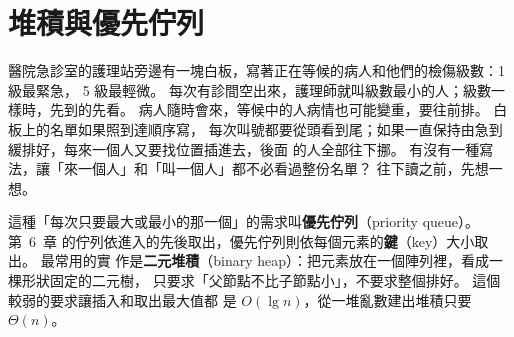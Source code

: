 \chapter{堆積與優先佇列}
\label{ch:heaps}

\newif\ifhpshowidx
\newcommand{\hpheap}[4]{%
    \foreach \hpv/\hps [count=\hpi] in {#3} {%
        \pgfmathtruncatemacro{\hplev}{floor(ln(\hpi)/ln(2) + 0.0001)}%
        \pgfmathsetmacro{\hpx}{(\hpi - 2^\hplev + 0.5) * #2 / 2^\hplev - #2 / 2}%
        \node[hp\hps] (#4\hpi) at ($(#1) + (\hpx, -0.95*\hplev)$) {\hpv};%
        \ifhpshowidx
            \node[hpidx, anchor=south west] at (#4\hpi.north east) {\hpi};%
        \fi
        \ifnum\hpi>1
            \pgfmathtruncatemacro{\hpp}{floor(\hpi/2)}%
            \draw[hpedge] (#4\hpp) -- (#4\hpi);%
        \fi
    }%
}
\newcommand{\hparray}[2]{%
    \foreach \hpv/\hps [count=\hpi] in {#2} {%
        \node[hpc\hps] at ($(#1) + (0.8*\hpi, 0)$) {\hpv};%
        \node[idxlbl] at ($(#1) + (0.8*\hpi, -0.6)$) {\hpi};%
    }%
}

醫院急診室的護理站旁邊有一塊白板，寫著正在等候的病人和他們的檢傷級數：1 級最緊急，
5 級最輕微。 每次有診間空出來，護理師就叫級數最小的人；級數一樣時，先到的先看。
病人隨時會來，等候中的人病情也可能變重，要往前排。 白板上的名單如果照到達順序寫，
每次叫號都要從頭看到尾；如果一直保持由急到緩排好，每來一個人又要找位置插進去，後面
的人全部往下挪。 有沒有一種寫法，讓「來一個人」和「叫一個人」都不必看過整份名單？
往下讀之前，先想一想。

這種「每次只要最大或最小的那一個」的需求叫\textbf{優先佇列}（priority queue）。 第~6~章
的佇列依進入的先後取出，優先佇列則依每個元素的\textbf{鍵}（key）大小取出。 最常用的實
作是\textbf{二元堆積}（binary heap）：把元素放在一個陣列裡，看成一棵形狀固定的二元樹，
只要求「父節點不比子節點小」，不要求整個排好。 這個較弱的要求讓插入和取出最大值都
是 $O(\lg n)$，從一堆亂數建出堆積只要 $\Theta(n)$。

